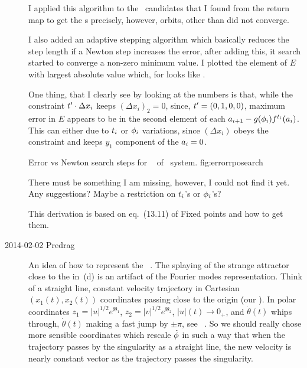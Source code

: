 \begin{description}
I applied this algorithm to the \rpo\ candidates that I found from the return
map to get the \rpo s precisely, however, orbits, other than  did not
converge.

I also added an adaptive stepping algorithm which basically reduces the
step length if a Newton step increases the error, after adding this, it
search started to converge a non-zero minimum value. I plotted the
element of $E$ with largest absolute value which, for  looks
like .

One thing, that I clearly see by looking at the numbers is that, while the
constraint $t'_{} \cdot \Delta x_i$  keeps $(\Delta x_i)_2 = 0$, since,
$t'_{} = (0,1,0,0)$, maximum error in $E$ appears to be in the second
element of each $\ssp_{i+1} - \LieEl (\gSpace_i) \flow{\zeit_i}{\ssp_i}$. This can
either due to $\zeit_i$ or ${\bf \phi}_i$ variations, since $(\Delta x_i)$ obeys the
constraint and keeps $y_1$ component of the $a_i = 0$.

{}{
Error vs Newton search steps for \rpo\  of \twomode\ system.
}{fig:errorrposearch}

There must be something I am missing, however, I could not find it yet. Any
suggestions? Maybe a restriction on $\zeit_i$'s or ${\bf \phi}_i$'s?

This derivation is based on eq.~(13.11) of
{Fixed points and how to get them}.

\renewcommand{\zeit}{\ensuremath{t}}  %
\item[2014-02-02 Predrag] An idea of how to represent the \twomode\
\statesp. The splaying of the strange attractor close to the {\sliceBord}
in \reffig{fig:Set1}\,(d) is an artifact of the Fourier modes
representation. Think of a straight line, constant velocity trajectory in
Cartesian $(x_1(\zeit),x_2(\zeit))$ coordinates passing close to the
origin (our {\sliceBord}). In polar coordinates $ {z}_1 = |u|^{1/2}
e^{\ii\theta_1}$, $ {z}_2 = |v|^{1/2} e^{\ii\theta_2}$, $|u|(\zeit) \to
0_+$, and $\dot{\theta}(\zeit)$ whips through,
$\dot{\theta}(\zeit)$ making a fast jump by
$\pm\pi$, see \cLf\ . So we should really chose more
sensible coordinates which rescale $\dot{{\bf \phi}}$ in such a way that
when the trajectory passes by the singularity as a straight line, the new
velocity is nearly constant vector as the trajectory passes the
singularity.


\end{description}
